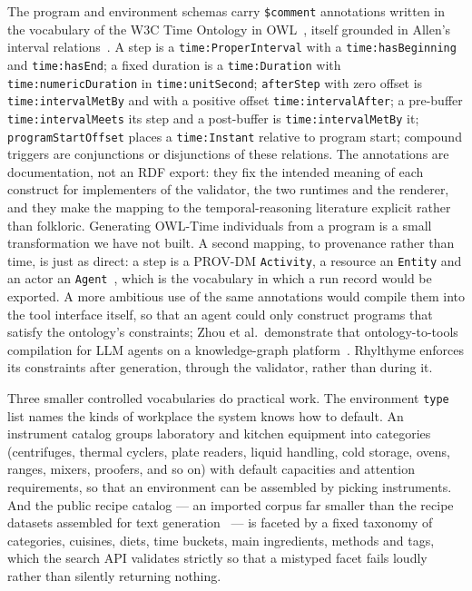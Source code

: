 \documentclass[10pt]{article}
\newcommand{\rt}{Rhylthyme}
\newcommand{\code}[1]{\texttt{#1}}
\begin{document}
The program and environment schemas carry \code{\$comment} annotations written in the vocabulary of the W3C Time Ontology in OWL~\cite{hobbs2004owltime,w3c2020owltime}, itself grounded in Allen's interval relations~\cite{allen1983intervals}. A step is a \code{time:ProperInterval} with a \code{time:hasBeginning} and \code{time:hasEnd}; a fixed duration is a \code{time:Duration} with \code{time:numericDuration} in \code{time:unitSecond}; \code{afterStep} with zero offset is \code{time:intervalMetBy} and with a positive offset \code{time:intervalAfter}; a pre-buffer \code{time:intervalMeets} its step and a post-buffer is \code{time:intervalMetBy} it; \code{programStartOffset} places a \code{time:Instant} relative to program start; compound triggers are conjunctions or disjunctions of these relations. The annotations are documentation, not an RDF export: they fix the intended meaning of each construct for implementers of the validator, the two runtimes and the renderer, and they make the mapping to the temporal-reasoning literature explicit rather than folkloric. Generating OWL-Time individuals from a program is a small transformation we have not built. A second mapping, to provenance rather than time, is just as direct: a step is a PROV-DM \code{Activity}, a resource an \code{Entity} and an actor an \code{Agent}~\cite{moreau2013provdm}, which is the vocabulary in which a run record would be exported. A more ambitious use of the same annotations would compile them into the tool interface itself, so that an agent could only construct programs that satisfy the ontology's constraints; Zhou et al.\ demonstrate that ontology-to-tools compilation for LLM agents on a knowledge-graph platform~\cite{zhou2026ontology}. \rt{} enforces its constraints after generation, through the validator, rather than during it.

Three smaller controlled vocabularies do practical work. The environment \code{type} list names the kinds of workplace the system knows how to default. An instrument catalog groups laboratory and kitchen equipment into categories (centrifuges, thermal cyclers, plate readers, liquid handling, cold storage, ovens, ranges, mixers, proofers, and so on) with default capacities and attention requirements, so that an environment can be assembled by picking instruments. And the public recipe catalog --- an imported corpus far smaller than the recipe datasets assembled for text generation~\cite{bien2020recipenlg} --- is faceted by a fixed taxonomy of categories, cuisines, diets, time buckets, main ingredients, methods and tags, which the search API validates strictly so that a mistyped facet fails loudly rather than silently returning nothing.
\end{document}
